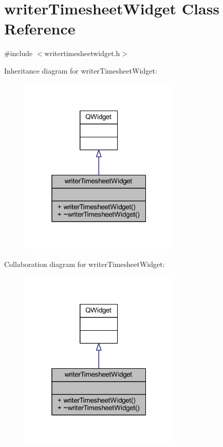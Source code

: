 \hypertarget{classwriter_timesheet_widget}{}\section{writer\+Timesheet\+Widget Class Reference}
\label{classwriter_timesheet_widget}


{\ttfamily \#include $<$writertimesheetwidget.\+h$>$}



Inheritance diagram for writer\+Timesheet\+Widget\+:
\nopagebreak
\begin{figure}[H]
\begin{center}
\leavevmode
\includegraphics[width=217pt]{classwriter_timesheet_widget__inherit__graph}
\end{center}
\end{figure}


Collaboration diagram for writer\+Timesheet\+Widget\+:
\nopagebreak
\begin{figure}[H]
\begin{center}
\leavevmode
\includegraphics[width=217pt]{classwriter_timesheet_widget__coll__graph}
\end{center}
\end{figure}
